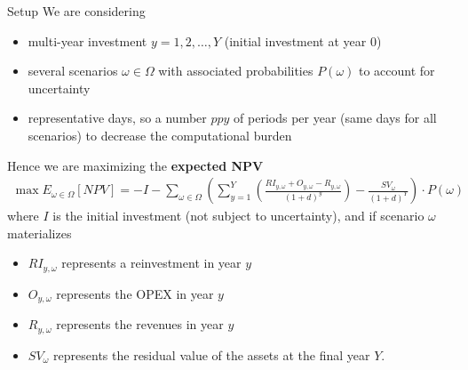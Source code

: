 \begin{frame}[allowframebreaks]{Setup}
We are considering 
\begin{itemize}
    \item multi-year investment $y = 1, 2, \ldots, Y$ (initial investment at year $0$) %
    \item several scenarios $\omega \in \Omega$ with associated probabilities $P(\omega)$ to account for uncertainty %
    \item representative days, so a number $ppy$ of periods per year (same days for all scenarios) to decrease the computational burden %
\end{itemize}
Hence we are maximizing the \textbf{expected NPV}
\begin{align}
    \max E_{\omega \in \Omega} [NPV] = 
    - I - \sum_{\omega \in \Omega} \left( \sum_{y=1}^{Y}\left(\frac{RI_{y,\omega} + O_{y,\omega} - R_{y,\omega}}{(1 + d)^y}  \right) - \frac{{SV_\omega}}{(1+d)^Y}\right)  \cdot P(\omega)
\end{align}
where $I$ is the initial investment (not subject to uncertainty), and if scenario $\omega$ materializes
\begin{itemize}
    \item $RI_{y,\omega}$ represents a reinvestment in year $y$ 
    \item $O_{y,\omega}$ represents the OPEX in year $y$ 
    \item $R_{y,\omega}$ represents the revenues in year $y$
    \item $SV_{\omega}$ represents the residual value of the assets at the final year $Y$.
\end{itemize}
\end{frame}

